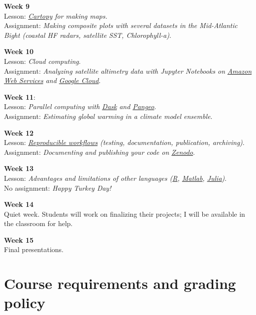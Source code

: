 \documentclass[11pt]{article}
\begin{document}
\textbf{Week 9}\\
 Lesson: \textit{\href{https://scitools.org.uk/cartopy/docs/latest/}{Cartopy} for making maps.}\\
 Assignment: \textit{Making composite plots with several datasets in the Mid-Atlantic Bight (coastal HF radars, satellite SST, Chlorophyll-a)}.

\textbf{Week 10}\\
 Lesson: \textit{Cloud computing}.\\
 Assignment: \textit{Analyzing satellite altimetry data with Jupyter Notebooks on \href{https://aws.amazon.com}{Amazon Web Services} and \href{https://cloud.google.com}{Google Cloud}}.

 \textbf{Week 11}:\\
 Lesson:  \textit{Parallel computing with \href{https://dask.org/}{Dask} and \href{https://pangeo.io/}{Pangeo}}.\\
  Assignment: \textit{Estimating global warming in a climate model ensemble}.

\textbf{Week 12}\\
 Lesson: \textit{\href{http://www.practicereproducibleresearch.org/core-chapters/3-basic.html}{Reproducible workflows} (testing, documentation, publication, archiving)}.\\
 Assignment: \textit{Documenting and publishing your code on \href{https://zenodo.org}{Zenodo}}.

\textbf{Week 13}\\
 Lesson: \textit{Advantages and limitations of other languages (\href{https://www.r-project.org/about.html}{R}, \href{https://www.mathworks.com/products/matlab.html}{Matlab}, \href{https://julialang.org/}{Julia})}.\\
 No assignment: \textit{Happy Turkey Day!}

\textbf{Week 14}\\
Quiet week. Students will work on finalizing their projects; I will be available  in the classroom for help.

\textbf{Week 15}\\
Final presentations.


\section*{Course requirements and grading policy}
\end{document}
